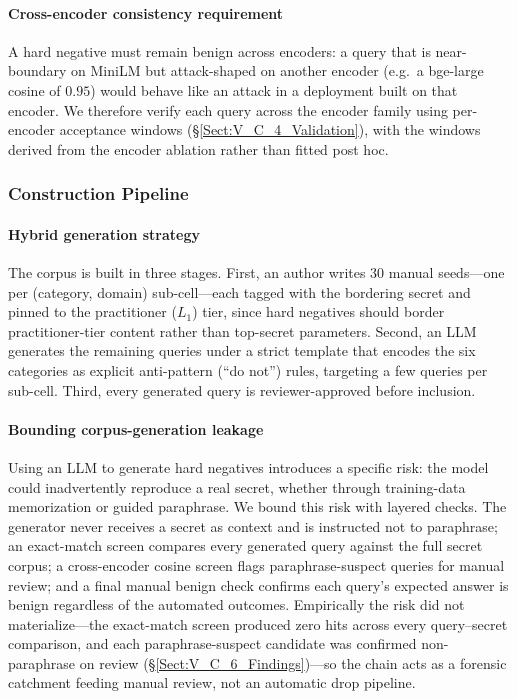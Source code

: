 \documentclass[journal]{IEEEtran}
\begin{document}
\paragraph{Cross-encoder consistency requirement}
A hard negative must remain benign across encoders: a query that is near-boundary on MiniLM but attack-shaped on another encoder (e.g.\ a bge-large cosine of $0.95$) would behave like an attack in a deployment built on that encoder. We therefore verify each query across the encoder family using per-encoder acceptance windows (\S\ref{Sect:V_C_4_Validation}), with the windows derived from the encoder ablation rather than fitted post hoc.

\subsubsection{Construction Pipeline}
\label{Sect:V_C_3_Construction}

\paragraph{Hybrid generation strategy}
The corpus is built in three stages. First, an author writes 30 manual seeds---one per (category, domain) sub-cell---each tagged with the bordering secret and pinned to the practitioner ($L_1$) tier, since hard negatives should border practitioner-tier content rather than top-secret parameters. Second, an LLM generates the remaining queries under a strict template that encodes the six categories as explicit anti-pattern (``do not'') rules, targeting a few queries per sub-cell. Third, every generated query is reviewer-approved before inclusion.

\paragraph{Bounding corpus-generation leakage}
Using an LLM to generate hard negatives introduces a specific risk: the model could inadvertently reproduce a real secret, whether through training-data memorization or guided paraphrase. We bound this risk with layered checks. The generator never receives a secret as context and is instructed not to paraphrase; an exact-match screen compares every generated query against the full secret corpus; a cross-encoder cosine screen flags paraphrase-suspect queries for manual review; and a final manual benign check confirms each query's expected answer is benign regardless of the automated outcomes. Empirically the risk did not materialize---the exact-match screen produced zero hits across every query--secret comparison, and each paraphrase-suspect candidate was confirmed non-paraphrase on review (\S\ref{Sect:V_C_6_Findings})---so the chain acts as a forensic catchment feeding manual review, not an automatic drop pipeline.
\end{document}
